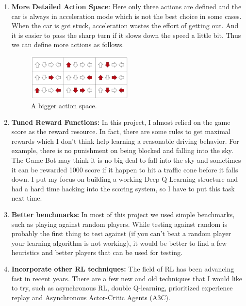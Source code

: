 \documentclass[a4paper]{article}
\begin{document}
\begin{enumerate}

    \item \textbf{More Detailed Action Space}: Here only three actions are defined and the car is always in acceleration mode which is not the best choice in some cases. When the car is got stuck, acceleration wastes the effort of getting out. And it is easier to pass the sharp turn if it slows down the speed a little bit. Thus we can define more actions as follows.
	\begin{figure}[h]
	\centering
	\includegraphics[width=0.5\textwidth]{full-action-space}
	\caption{A bigger action space.}
	\end{figure}    
    
    \item \textbf{Tuned Reward Functions:} In this project, I almost relied on the game score as the reward resource. In fact, there are some rules to get maximal rewards which I don't think help learning a reasonable driving behavior. For example, there is no punishment on being blocked and falling into the sky. The Game Bot may think it is no big deal to fall into the sky and sometimes it can be rewarded 1000 score if it happen to hit a traffic cone before it falls down. I put my focus on building a working Deep Q Learning structure and had a hard time hacking into the scoring system, so I have to put this task next time.
    \item \textbf{Better benchmarks:} In most of this project we used simple benchmarks, such as playing against random players. While testing against random is probably the first thing to test against (if you can't beat a random player your learning algorithm is not working), it would be better to find a few heuristics and better players that can be used for testing.

    \item \textbf{Incorporate other RL techniques:} The field of RL has been advancing fast in recent years. There are a few new and old techniques that I would like to try, such as asynchronous RL, double Q-learning, prioritized experience replay and Asynchronous Actor-Critic Agents (A3C).

\end{enumerate}
\end{document}
